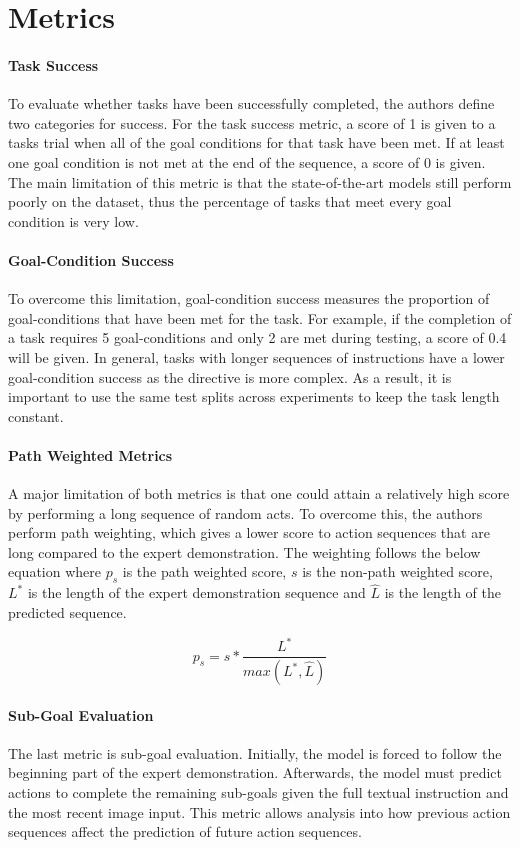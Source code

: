 \documentclass[11pt,a4paper]{article}
\begin{document}
\section{Metrics}

\paragraph{Task Success} To evaluate whether tasks have been successfully completed, the authors define two categories for success. For the task success metric, a score of 1 is given to a tasks trial when all of the goal conditions for that task have been met. If at least one goal condition is not met at the end of the sequence, a score of 0 is given. The main limitation of this metric is that the state-of-the-art models still perform poorly on the dataset, thus the percentage of tasks that meet every goal condition is very low.

\paragraph{Goal-Condition Success} To overcome this limitation, goal-condition success measures the proportion of goal-conditions that have been met for the task. For example, if the completion of a task requires 5 goal-conditions and only 2 are met during testing, a score of 0.4 will be given. In general, tasks with longer sequences of instructions have a lower goal-condition success as the directive is more complex. As a result, it is important to use the same test splits across experiments to keep the task length constant.

\paragraph{Path Weighted Metrics} A major limitation of both metrics is that one could attain a relatively high score by performing a long sequence of random acts. To overcome this, the authors perform path weighting, which gives a lower score to action sequences that are long compared to the expert demonstration. The weighting follows the below equation where $p_s$ is the path weighted score, $s$ is the non-path weighted score, $L^*$ is the length of the expert demonstration sequence and $\hat{L}$ is the length of the predicted sequence.

$$p_s = s * \frac{L^{*}}{max(L^{*}, \hat{L} )}$$

\paragraph{Sub-Goal Evaluation} The last metric is sub-goal evaluation. Initially, the model is forced to follow the beginning part of the expert demonstration. Afterwards, the model must predict actions to complete the remaining sub-goals given the full textual instruction and the most recent image input. This metric allows analysis into how previous action sequences affect the prediction of future action sequences.
\end{document}
